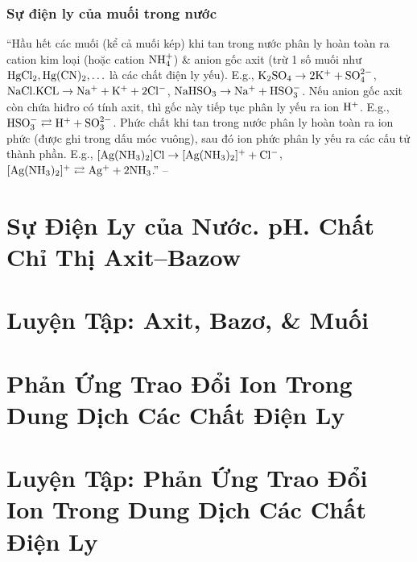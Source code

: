 \documentclass[oneside]{book}
\numberwithin{equation}{section}
\begin{document}
\subsubsection{Sự điện ly của muối trong nước}
``Hầu hết các muối (kể cả muối kép) khi tan trong nước phân ly hoàn toàn ra cation kim loại (hoặc cation $\rm NH_4^+$) \& anion gốc axit (trừ 1 số muối như $\rm HgCl_2,Hg(CN)_2,\ldots$ là các chất điện ly yếu). E.g., $\rm K_2SO_4\to 2K^+ + SO_4^{2-}$, $\rm NaCl.KCL\to Na^+ + K^+ + 2Cl^-$, $\rm NaHSO_3\to Na^+ + HSO_3^-$. Nếu anion gốc axit còn chứa hiđro có tính axit, thì gốc này tiếp tục phân ly yếu ra ion $\rm H^+$. E.g., $\rm HSO_3^-\rightleftarrows H^+ + SO_3^{2-}$. Phức chất khi tan trong nước phân ly hoàn toàn ra ion phức (được ghi trong dấu móc vuông), sau đó ion phức phân ly yếu ra các cấu tử thành phần. E.g., $\rm[Ag(NH_3)_2]Cl\to[Ag(NH_3)_2]^+ + Cl^-$, $\rm[Ag(NH_3)_2]^+\rightleftarrows Ag^+ + 2NH_3$.'' -- \cite[p. 15]{SGK_Hoa_Hoc_11_nang_cao}


\section{Sự Điện Ly của Nước. pH. Chất Chỉ Thị Axit--Bazow}


\section{Luyện Tập: Axit, Bazơ, \& Muối}


\section{Phản Ứng Trao Đổi Ion Trong Dung Dịch Các Chất Điện Ly}


\section{Luyện Tập: Phản Ứng Trao Đổi Ion Trong Dung Dịch Các Chất Điện Ly}

\end{document}
